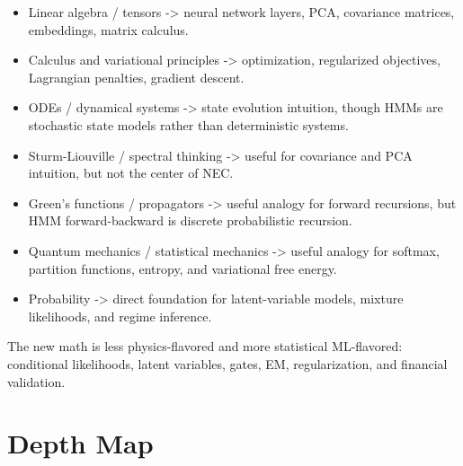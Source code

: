 \documentclass[11pt]{article}
\begin{document}
\begin{itemize}
  \item Linear algebra / tensors -> neural network layers, PCA, covariance matrices, embeddings, matrix calculus.
  \item Calculus and variational principles -> optimization, regularized objectives, Lagrangian penalties, gradient descent.
  \item ODEs / dynamical systems -> state evolution intuition, though HMMs are stochastic state models rather than deterministic systems.
  \item Sturm-Liouville / spectral thinking -> useful for covariance and PCA intuition, but not the center of NEC.
  \item Green's functions / propagators -> useful analogy for forward recursions, but HMM forward-backward is discrete probabilistic recursion.
  \item Quantum mechanics / statistical mechanics -> useful analogy for softmax, partition functions, entropy, and variational free energy.
  \item Probability -> direct foundation for latent-variable models, mixture likelihoods, and regime inference.
\end{itemize}

The new math is less physics-flavored and more statistical ML-flavored: conditional likelihoods, latent variables, gates, EM, regularization, and financial validation.

\section{Depth Map}
\end{document}
